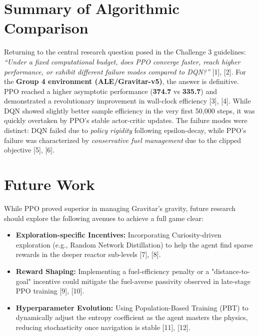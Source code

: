 \documentclass[conference]{IEEEtran}
\begin{document}

\section{Summary of Algorithmic Comparison}
Returning to the central research question posed in the Challenge 3 guidelines: \textit{``Under a fixed computational budget, does PPO converge faster, reach higher performance, or exhibit different failure modes compared to DQN?''} [1], [2].
For the \textbf{Group 4 environment (ALE/Gravitar-v5)}, the answer is definitive.
PPO reached a higher asymptotic performance (\textbf{374.7} vs \textbf{335.7}) and demonstrated a revolutionary improvement in wall-clock efficiency [3], [4].
While DQN showed slightly better sample efficiency in the very first 50,000 steps, it was quickly overtaken by PPO’s stable actor-critic updates.
The failure modes were distinct: DQN failed due to \textit{policy rigidity} following epsilon-decay, while PPO’s failure was characterized by \textit{conservative fuel management} due to the clipped objective [5], [6].

\section{Future Work}
While PPO proved superior in managing Gravitar’s gravity, future research should explore the following avenues to achieve a full game clear:
\begin{itemize}
    \item \textbf{Exploration-specific Incentives:} Incorporating Curiosity-driven exploration (e.g., Random Network Distillation) to help the agent find sparse rewards in the deeper reactor sub-levels [7], [8].
    \item \textbf{Reward Shaping:} Implementing a fuel-efficiency penalty or a "distance-to-goal" incentive could mitigate the fuel-averse passivity observed in late-stage PPO training [9], [10].
    \item \textbf{Hyperparameter Evolution:} Using Population-Based Training (PBT) to dynamically adjust the entropy coefficient as the agent masters the physics, reducing stochasticity once navigation is stable [11], [12].
\end{itemize}
\end{document}
